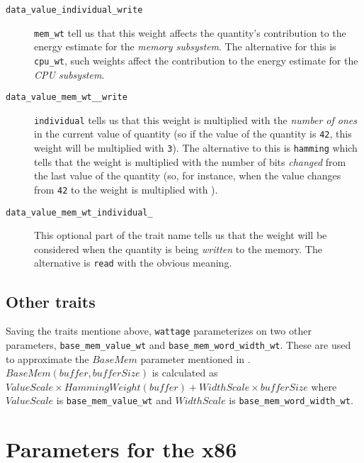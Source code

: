\begin{description}
\item[\texttt{data\_value\_individual\_write}] \hfill

  \texttt{mem\_wt} tell us that this weight affects the quantity's
  contribution to the energy estimate for the \textit{memory
    subsystem}.  The alternative for this is \texttt{cpu\_wt}, such
  weights affect the contribution to the energy estimate for the
  \textit{CPU subsystem}.

\item[\texttt{data\_value\_mem\_wt\_\_write}] \hfill

  \texttt{individual} tells us that this weight is multiplied with the
  \textit{number of ones} in the current value of quantity (so if the
  value of the quantity is \texttt{42}, this weight will be multiplied
  with \texttt{3}).  The alternative to this is \texttt{hamming} which
  tells that the weight is multiplied with the number of bits
  \textit{changed} from the last value of the quantity (so, for
  instance, when the value changes from \texttt{42} to  the
  weight is multiplied with ).

\item[\texttt{data\_value\_mem\_wt\_individual\_}] \hfill

  This optional part of the trait name tells us that the weight will
  be considered when the quantity is being \textit{written} to the
  memory.  The alternative is \texttt{read} with the obvious meaning.
  
\end{description}

\subsection{Other traits}

Saving the traits mentione above, \texttt{wattage} parameterizes on
two other parameters, \texttt{base\_mem\_value\_wt} and
\texttt{base\_mem\_word\_width\_wt}.  These are used to approximate
the $BaseMem$ parameter mentioned in \cite{steinke}.  $BaseMem(buffer,
bufferSize)$ is calculated as $ValueScale \times HammingWeight(buffer)
+ WidthScale \times bufferSize$ where $ValueScale$ is
\texttt{base\_mem\_value\_wt} and $WidthScale$ is
\texttt{base\_mem\_word\_width\_wt}.

\section{Parameters for the x86} \label{sec:trait-values}

